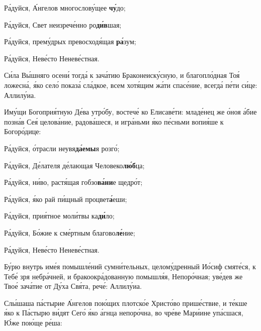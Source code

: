 \begin{russian}

  Ра́дуйся, А́нгелов многослову́щее \textbf{чу́}до;


  Ра́дуйся, Свет неизрече́нно ро\textbf{ди́в}шая;


  Ра́дуйся, прему́дрых превосходя́щая \textbf{ра́}зум;


  Ра́дуйся, Неве́сто Неневе́стная.


  \Ierei Си́ла Вы́шняго осени́ тогда́ к зача́тию Браконеиску́сную, и благопло́дная Тоя́ ложесна́, я́ко село́ показа́ сла́дкое, всем хотя́щим жа́ти спасе́ние, всегда́ пе́ти си́це: Аллилу́иа.


  \Ierei Иму́щи Богоприя́тную Де́ва утро́бу, востече́ ко Елисаве́ти: младе́нец же о́ноя а́бие позна́в Сея́ целова́ние, радова́шеся, и игра́ньми я́ко пе́сньми вопия́ше к Богоро́дице:

  \KhorRaduisya Ра́дуйся, о́трасли неувя\textbf{да́емы}я розго́;


  Ра́дуйся, Де́лателя де́лающая Человеко\textbf{лю́б}ца;


  Ра́дуйся, ни́во, растя́щая гобзо\textbf{ва́ни}е щедро́т;


  Ра́дуйся, я́ко рай пи́щный процвет\textbf{а́}еши;


  Ра́дуйся, прия́тное моли́твы ка\textbf{ди́}ло;


  Ра́дуйся, Бо́жие к сме́ртным благово\textbf{ле́}ние;


  Ра́дуйся, Неве́сто Неневе́стная.


  \Ierei Бу́рю внутрь име́я помышле́ний сумни́тельных, целому́дренный Ио́сиф смяте́ся, к Тебе́ зря небра́чней, и бракоокра́дованную помышля́я, Непоро́чная; уве́дев же Твое́ зача́тие от Ду́ха Свя́та, рече́: Аллилу́иа.


  \Ierei Слы́шаша па́стырие А́нгелов пою́щих плотско́е Христо́во прише́ствие, и те́кше я́ко к Па́стырю ви́дят Сего́ я́ко а́гнца непоро́чна, во чре́ве Мари́ине упа́сшася, Ю́же пою́ще ре́ша:

\end{russian}
\pagebreak

